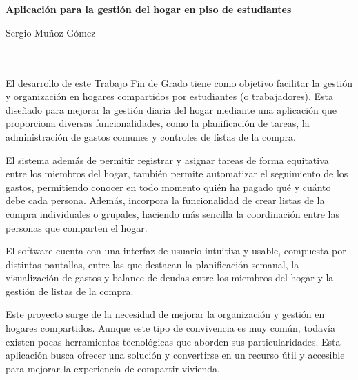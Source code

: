 \chapter*{}






\thispagestyle{empty}
\vspace{-5cm}

\begin{center}
{\large\bfseries Aplicación para la gestión del hogar en piso de estudiantes}\\
\end{center}
\begin{center}
Sergio Muñoz Gómez\\
\end{center}

\\

\vspace{0.7cm}
\\

El desarrollo de este Trabajo Fin de Grado tiene como objetivo facilitar la gestión y organización en hogares compartidos por estudiantes (o trabajadores). 
Esta diseñado para mejorar la gestión diaria del hogar mediante una aplicación que proporciona diversas funcionalidades, como la planificación de tareas, la administración de gastos comunes y controles de listas de la compra.


El sistema además de permitir registrar y asignar tareas de forma equitativa entre los miembros del hogar, también permite automatizar el seguimiento de los gastos, permitiendo conocer en todo momento 
quién ha pagado qué y cuánto debe cada persona. Además, incorpora la funcionalidad de crear listas de la compra individuales o grupales, haciendo más sencilla la coordinación entre las personas que comparten el hogar.


El software cuenta con una interfaz de usuario intuitiva y usable, compuesta por distintas pantallas, entre las que destacan la planificación semanal, la 
visualización de gastos y balance de deudas entre los miembros del hogar y la gestión de listas de la compra.

Este proyecto surge de la necesidad de mejorar la organización y gestión en hogares compartidos. Aunque este tipo de convivencia es muy común, todavía existen pocas herramientas 
tecnológicas que aborden sus particularidades. Esta aplicación busca ofrecer una solución y convertirse en un recurso útil y accesible para mejorar la experiencia de compartir vivienda. 

